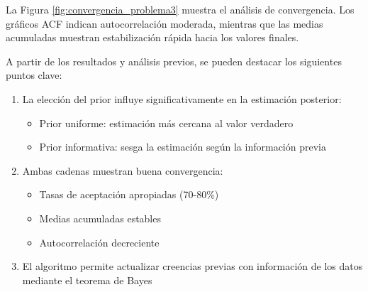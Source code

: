 \documentclass[12pt,a4paper]{article}
\begin{document}
La Figura \ref{fig:convergencia_problema3} muestra el análisis de convergencia. Los gráficos ACF indican autocorrelación moderada, mientras que las medias acumuladas muestran estabilización rápida hacia los valores finales.

A partir de los resultados y análisis previos, se pueden destacar los siguientes puntos clave:

\begin{enumerate}
    \item La elección del prior influye significativamente en la estimación posterior:
    \begin{itemize}
        \item Prior uniforme: estimación más cercana al valor verdadero
        \item Prior informativa: sesga la estimación según la información previa
    \end{itemize}
    
    \item Ambas cadenas muestran buena convergencia:
    \begin{itemize}
        \item Tasas de aceptación apropiadas (70-80\%)
        \item Medias acumuladas estables
        \item Autocorrelación decreciente
    \end{itemize}
    
    \item El algoritmo permite actualizar creencias previas con información de los datos mediante el teorema de Bayes
\end{enumerate}
\end{document}
